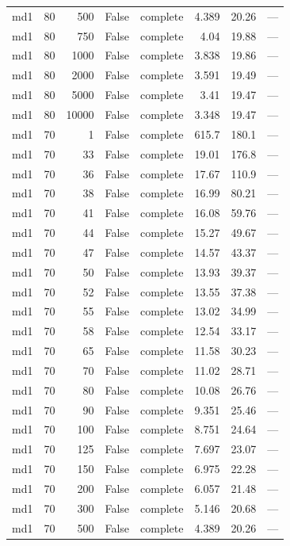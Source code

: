 \begin{tabular}{lrrrlrrl}
md1 & 80 & 500 & False & complete & 4.389 & 20.26 & — \\
md1 & 80 & 750 & False & complete & 4.04 & 19.88 & — \\
md1 & 80 & 1000 & False & complete & 3.838 & 19.86 & — \\
md1 & 80 & 2000 & False & complete & 3.591 & 19.49 & — \\
md1 & 80 & 5000 & False & complete & 3.41 & 19.47 & — \\
md1 & 80 & 10000 & False & complete & 3.348 & 19.47 & — \\
md1 & 70 & 1 & False & complete & 615.7 & 180.1 & — \\
md1 & 70 & 33 & False & complete & 19.01 & 176.8 & — \\
md1 & 70 & 36 & False & complete & 17.67 & 110.9 & — \\
md1 & 70 & 38 & False & complete & 16.99 & 80.21 & — \\
md1 & 70 & 41 & False & complete & 16.08 & 59.76 & — \\
md1 & 70 & 44 & False & complete & 15.27 & 49.67 & — \\
md1 & 70 & 47 & False & complete & 14.57 & 43.37 & — \\
md1 & 70 & 50 & False & complete & 13.93 & 39.37 & — \\
md1 & 70 & 52 & False & complete & 13.55 & 37.38 & — \\
md1 & 70 & 55 & False & complete & 13.02 & 34.99 & — \\
md1 & 70 & 58 & False & complete & 12.54 & 33.17 & — \\
md1 & 70 & 65 & False & complete & 11.58 & 30.23 & — \\
md1 & 70 & 70 & False & complete & 11.02 & 28.71 & — \\
md1 & 70 & 80 & False & complete & 10.08 & 26.76 & — \\
md1 & 70 & 90 & False & complete & 9.351 & 25.46 & — \\
md1 & 70 & 100 & False & complete & 8.751 & 24.64 & — \\
md1 & 70 & 125 & False & complete & 7.697 & 23.07 & — \\
md1 & 70 & 150 & False & complete & 6.975 & 22.28 & — \\
md1 & 70 & 200 & False & complete & 6.057 & 21.48 & — \\
md1 & 70 & 300 & False & complete & 5.146 & 20.68 & — \\
md1 & 70 & 500 & False & complete & 4.389 & 20.26 & — \\

\end{tabular}
